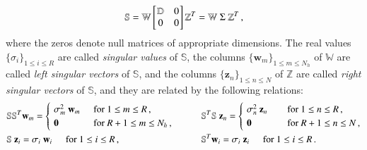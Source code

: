 \documentclass[longtitle]{elsarticle}
\numberwithin{equation}{section}
\theoremstyle{theorem}
\theoremstyle{definition}
\theoremstyle{remark}
\theoremstyle{proposition}
\numberwithin{figure}{section}
\begin{document}
		\begin{equation*}
			\mathbb{S} = \mathbb{W} 
			\begin{bmatrix}
			\hspace*{-0.15cm}
			\begin{array}{cc}
				\mathbb{D} & 0 \\
				0 & 0
			\end{array} 
			\hspace*{-0.15cm}
			\end{bmatrix}
			\mathbb{Z}^T = \mathbb{W} ~ \Sigma ~ \mathbb{Z}^T \, ,
		\end{equation*}
		where the zeros denote null matrices of appropriate dimensions. The real values $\big\lbrace \sigma_i \big\rbrace_{1 \leq i \leq R}$ are called \emph{singular values} of $\mathbb{S}$, the columns $\big\lbrace \mathbf{w}_m \big\rbrace_{1 \leq m \leq N_h}$ of $\mathbb{W}$ are called \emph{left singular vectors} of $\mathbb{S}$, and the columns $\big\lbrace \mathbf{z}_n \big\rbrace_{1 \leq n \leq N}$ of $\mathbb{Z}$ are called \emph{right singular vectors} of $\mathbb{S}$, and they are related by the following relations:
		\begin{equation}
			\label{eq:svd-relationships}
			\begin{aligned}
				& \mathbb{S} \mathbb{S}^T \mathbf{w}_m = 
				\begin{cases}
					& \hspace*{-0.3cm} \sigma_m^2 ~ \mathbf{w}_m \hspace*{0.5cm} \text{for $1 \leq m \leq R$} \, , \\
					& \hspace*{-0.3cm} \mathrlap{\mathbf{0}}\hphantom{\sigma_m^2 ~ \mathbf{w}_m} \hspace*{0.5cm} \text{for $R+1 \leq m \leq {N_h}$} \, ,
				\end{cases}
				\qquad
				&& \mathbb{S}^T \mathbb{S} ~ \mathbf{z}_n =
				\begin{cases}
					& \hspace*{-0.3cm} \sigma_n^2 ~ \mathbf{z}_n \hspace*{0.74cm} \text{for $1 \leq n \leq R$} \, , \\
					& \hspace*{-0.3cm} \mathrlap{\mathbf{0}}\hphantom{\sigma_n^2 ~ \mathbf{z}_n} \hspace*{0.74cm} \text{for $R+1 \leq n \leq N$} \, ,
				\end{cases} \\
				& \mathbb{S} ~ \mathbf{z}_i = \sigma_i ~ \mathbf{w}_i \hspace*{0.5cm} \text{for $1 \leq i \leq R$} \, , 
				&& \mathbb{S}^T \mathbf{w}_i = \sigma_i ~ \mathbf{z}_i \hspace*{0.5cm} \text{for $1 \leq i \leq R$} \, .
			\end{aligned}
		\end{equation}
\end{document}
